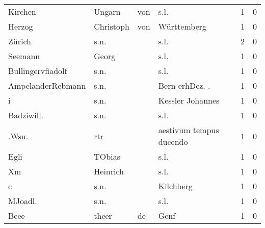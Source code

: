\documentclass[10pt,a4paper,landscape]{article}
\begin{document}
\begin{longtable}{llllrr}
                  Kirchen &                             Ungarn &         von &                                        s.l. &          1 &         0 \\
                   Herzog &                          Christoph &         von &                                 Württemberg &          1 &         0 \\
                   Zürich &                               s.n. &             &                                        s.l. &          2 &         0 \\
                  Seemann &                              Georg &             &                                        s.l. &          1 &         0 \\
        Bullingervfiadolf &                               s.n. &             &                                        s.l. &          1 &         0 \\
        AmpelanderRebmann &                               s.n. &             &                             Bern erhDez. .  &          1 &         0 \\
                        i &                               s.n. &             &                            Kessler Johannes &          1 &         0 \\
               Badziwill. &                               s.n. &             &                                        s.l. &          1 &         0 \\
                    .Wsu. &                                rtr &             &                     aestivum tempus ducendo &          1 &         0 \\
                     Egli &                             TObias &             &                                        s.l. &          1 &         0 \\
                       Xm &                           Heinrich &             &                                        s.l. &          1 &         0 \\
                        c &                               s.n. &             &                                   Kilchberg &          1 &         0 \\
                  MJoadl. &                               s.n. &             &                                        s.l. &          1 &         0 \\
                     Beee &                              theer &          de &                                        Genf &          1 &         0 \\

\end{longtable}
\end{document}
